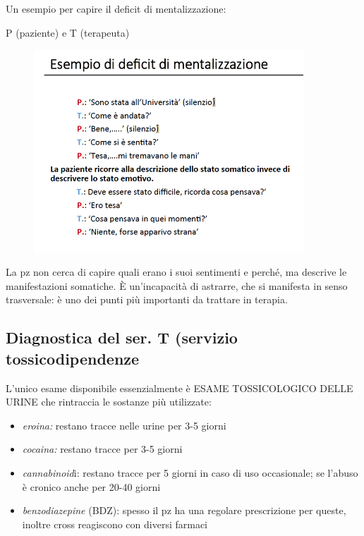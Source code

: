 Un esempio per capire il deficit di mentalizzazione:

P (paziente) e T (terapeuta)

\begin{figure}[!ht]
\centering
	\includegraphics[width=0.9\textwidth]{017/image7.png}
\end{figure}

La pz non cerca di capire quali erano i suoi sentimenti e perché, ma
descrive le manifestazioni somatiche. È un'incapacità di astrarre, che
si manifesta in senso trasversale: è uno dei punti più importanti da
trattare in terapia.

\subsection{Diagnostica del ser. T (servizio tossicodipendenze}

L'unico esame disponibile essenzialmente è ESAME TOSSICOLOGICO DELLE
URINE che rintraccia le sostanze più utilizzate:

\begin{itemize}
\item
  \emph{eroina:} restano tracce nelle urine per 3-5 giorni
\item
  \emph{cocaina:} restano tracce per 3-5 giorni
\item
  \emph{cannabinoid}i: restano tracce per 5 giorni in caso di uso
  occasionale; se l'abuso è cronico anche per 20-40 giorni
\item
  \emph{benzodiazepine} (BDZ): spesso il pz ha una regolare prescrizione
  per queste, inoltre cross reagiscono con diversi farmaci
\end{itemize}


